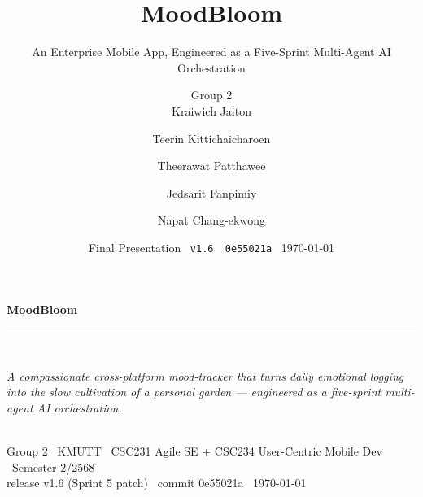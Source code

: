 \documentclass[aspectratio=169,11pt]{beamer}
\title{MoodBloom}
\subtitle{An Enterprise Mobile App, Engineered as a Five-Sprint Multi-Agent AI Orchestration}
\author[Group 2]{Group 2 \\ \small Kraiwich Jaiton \and Teerin Kittichaicharoen \and Theerawat Patthawee \and Jedsarit Fanpimiy \and Napat Chang-ekwong}
\institute{KMUTT \textperiodcentered\ CSC231 + CSC234 \textperiodcentered\ Semester 2/2568}
\date{Final Presentation \textperiodcentered\ \texttt{v1.6 \textperiodcentered\ 0e55021a} \textperiodcentered\ \today}
\begin{document}

\begin{frame}[plain]
  \centering
  \vfill
  {\Huge\bfseries\color{moodgreendark} MoodBloom}\\[0.3em]
  {\color{moodgreen}\rule{0.45\textwidth}{1.2pt}}\\[0.8em]
  \begin{minipage}{0.82\textwidth}\centering
    \normalsize\itshape
    A compassionate cross-platform mood-tracker that turns daily
    emotional logging into the slow cultivation of a personal garden ---
    engineered as a five-sprint multi-agent AI orchestration.
  \end{minipage}\\[1.2em]
  {\small Group 2 \textperiodcentered\ KMUTT \textperiodcentered\ CSC231 Agile SE + CSC234 User-Centric Mobile Dev \textperiodcentered\ Semester 2/2568}\\[0.5em]
  {\footnotesize\ttfamily release v1.6 (Sprint 5 patch) \textperiodcentered\ commit 0e55021a \textperiodcentered\ \today}
  \vfill
\end{frame}
\end{document}
